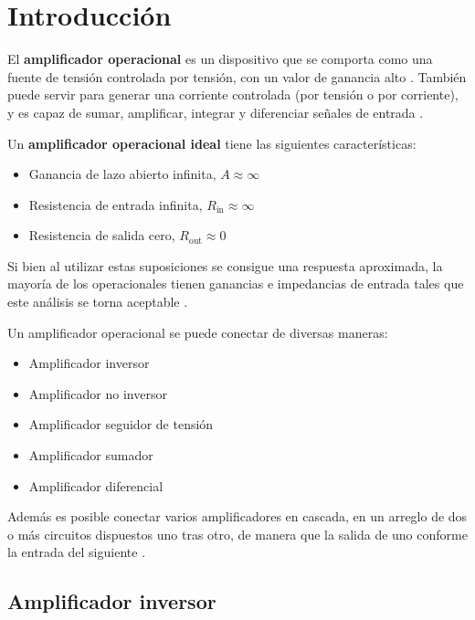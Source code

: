 \section{Introducción}
\label{sec:intro}

El \textbf{amplificador operacional} es un dispositivo que se comporta como una fuente de tensión controlada por tensión, con un valor de ganancia alto \cite[pág. 107]{huelsman}. También puede servir para generar una corriente controlada (por tensión o por corriente), y es capaz de sumar, amplificar, integrar y diferenciar señales de entrada \cite[pág. 176]{FDCE}. 


Un \textbf{amplificador operacional ideal} tiene las siguientes características:

\begin{itemize}
    \item Ganancia de lazo abierto infinita, $A\approx\infty$
    \item Resistencia de entrada infinita, $R_{\text{in}} \approx \infty$
    \item Resistencia de salida cero, $R_{\text{out}} \approx 0$
\end{itemize}

Si bien al utilizar estas suposiciones se consigue una respuesta aproximada, la mayoría de los operacionales tienen ganancias e impedancias de entrada tales que este análisis se torna aceptable \cite[pág. 180]{FDCE}.

Un amplificador operacional se puede conectar de diversas maneras:

\begin{itemize}
    \item Amplificador inversor
    \item Amplificador no inversor
    \item Amplificador seguidor de tensión
    \item Amplificador sumador
    \item Amplificador diferencial
\end{itemize}

Además es posible conectar varios amplificadores en cascada, en un arreglo de dos o más circuitos dispuestos uno tras otro, de manera que la salida de uno conforme la entrada del siguiente \cite[pág. 191]{FDCE}.

\subsection{Amplificador inversor}
\label{sec:intro:opamp-inversor}

